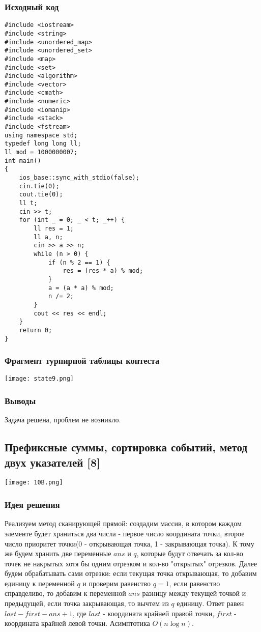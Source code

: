 \documentclass[12pt]{article}
\begin{document}
\subsubsection*{Исходный код}
\begin{lstlisting}
#include <iostream>
#include <string>
#include <unordered_map>
#include <unordered_set>
#include <map>
#include <set>
#include <algorithm>
#include <vector>
#include <cmath>
#include <numeric>
#include <iomanip>
#include <stack>
#include <fstream>
using namespace std;
typedef long long ll;
ll mod = 1000000007;
int main()
{
    ios_base::sync_with_stdio(false);
    cin.tie(0);
    cout.tie(0);
    ll t;
    cin >> t;
    for (int _ = 0; _ < t; _++) {
        ll res = 1;
        ll a, n;
        cin >> a >> n;
        while (n > 0) {
            if (n % 2 == 1) {
                res = (res * a) % mod;
            }
            a = (a * a) % mod;
            n /= 2;
        }
        cout << res << endl;
    }
    return 0;
}
\end{lstlisting}
\subsubsection*{Фрагмент турнирной таблицы контеста}
\begin{center}
\texttt{[image: state9.png]}\newline\noindent
\end{center}

\subsubsection*{Выводы}
Задача решена, проблем не возникло.
\subsection*{ Префиксные суммы, сортировка событий, метод двух указателей [8]}
\begin{center}
\texttt{[image: 10B.png]}
\end{center}
\subsubsection*{Идея решения}
Реализуем метод сканирующей прямой: создадим массив, в котором каждом элементе будет храниться два числа - первое число координата точки, второе число приоритет точки(0 - открывающая точка, 1 - закрывающая точка). К тому же будем хранить две переменные $ans$ и $q$, которые будут отвечать за кол-во точек не накрытых хотя бы одним отрезком и кол-во "открытых" отрезков. Далее будем обрабатывать сами отрезки: если текущая точка  открывающая, то добавим единицу к переменной $q$ и проверим равенство $q = 1$, если равенство справделиво, то добавим к переменной $ans$ разницу между текущей точкой и предыдущей, если точка закрывающая, то вычтем из $q$ единицу. Ответ равен $last - first - ans +1$, где $last$ - координата крайней правой точки, $first$ - координата крайней левой точки. Асимптотика $O(n\log{}n)$.
\end{document}
